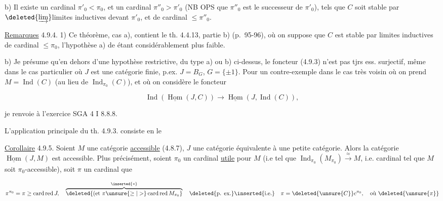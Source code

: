 
b) Il existe un cardinal $\pi'_0<\pi_0$, et un cardinal $\pi''_0>\pi'_0$ (NB OPS que $\pi''_0$ est le successeur de $\pi'_0$), tels que $C$ soit stable par $\deleted{\varinjlim}$limites inductives  devant $\pi'_0$, et de cardinal $\leq\pi''_0$.

\uline{Remarques} 4.9.4. 1) Ce théorème, cas a), contient le th. 4.4.13, partie b) (p.~95-96), où on suppose que $C$ est stable par limites inductives de cardinal $\leq\pi_0$, l'hypothèse a) de  étant considérablement plus faible.

b) Je présume qu'en dehors d'une hypothèse restrictive, du type a) ou b) ci-dessus, le foncteur  (4.9.3) n'est pas tjrs ess. surjectif, même dans le cas particulier où $J$ est une catégorie finie, p.ex. $J=B_G$, $G=\{\pm1\}$. Pour un contre-exemple dans le cas très voisin où on prend $M=\operatorname{Ind}(C)$ (au lieu de $\operatorname{Ind}_{\pi_0}(C)$), et où on considère le foncteur 

\[
\operatorname{Ind}(\underline{\operatorname{Hom}}(J,C))\longrightarrow\underline{\operatorname{Hom}}(J,\operatorname{Ind}(C)),
\]

je renvoie à l'exercice SGA 4 I 8.8.8.

 L'application principale du th. 4.9.3. consiste en le

\uline{Corollaire} 4.9.5. Soient $M$ une catégorie \uline{accessible} (4.8.7), $J$ une catégorie équivalente à une petite catégorie. Alors la catégorie  $\underline{\operatorname{Hom}}(J,M)$ est accessible. Plus précisément, soient $\pi_0$ un cardinal \uline{utile} pour $M$ (i.e tel que $\operatorname{Ind}_{\pi_0}(M_{\pi_0})\xrightarrow{\approx} M$,   i.e.  cardinal tel que $M$ soit $\pi_0$-accessible), soit $\pi$ un cardinal   que

\[
\pi^{\pi_0}=\pi\geq\operatorname{card}\operatorname{red}J,\quad\overbrace{\deleted{\text{(et }\pi\unsure{\geq|>}\operatorname{card}\operatorname{red} M_{\pi_0}}}^{\inserted{\ast}}\quad\deleted{\text{p. ex.}}\inserted{\text{i.e.}}\quad\pi=\deleted{\unsure{C}}c^{\pi_0},\quad\text{où }\deleted{\unsure{\pi}}
\]


